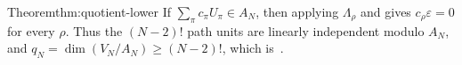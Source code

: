 \begin{Proof}{Theorem}{thm:quotient-lower}
If $\sum_\pi c_\pi U_\pi\in A_N$, then applying $\Lambda_\rho$ and
 gives
$c_\rho\varepsilon=0$ for every $\rho$. Thus the $(N-2)!$ path units are
linearly independent modulo $A_N$, and $q_N=\dim(V_N/A_N)\geq(N-2)!$,
which is~.
\end{Proof}
